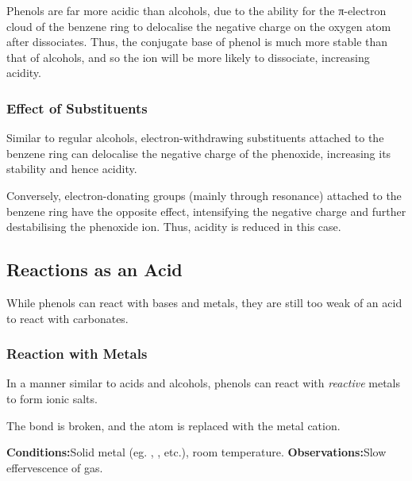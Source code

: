 			Phenols are far more acidic than alcohols, due to the ability for the π-electron cloud of the benzene ring to delocalise the
			negative charge on the oxygen atom after  dissociates. Thus, the conjugate base of phenol is much more stable than
			that of alcohols, and so the  ion will be more likely to dissociate, increasing acidity.

			\subsubsection{Effect of Substituents}

				Similar to regular alcohols, electron-withdrawing substituents attached to the benzene ring can delocalise the negative
				charge of the phenoxide, increasing its stability and hence acidity.

				Conversely, electron-donating groups (mainly through resonance) attached to the benzene ring have the opposite effect,
				intensifying the negative charge and further destabilising the phenoxide ion. Thus, acidity is reduced in this case.




		\subsection{Reactions as an Acid}

			While phenols can react with bases and metals, they are still too weak of an acid to react with carbonates.

			\subsubsection{Reaction with Metals}
				In a manner similar to acids and alcohols, phenols can react with \textit{reactive} metals to form ionic salts.

				The  bond is broken, and the  atom is replaced with the metal cation.

				\vspace{1.5em}
				\vbox{\textbf{Conditions:}\tabto{35mm}Solid metal (eg. , , etc.), room temperature.}
				\vbox{\textbf{Observations:}\tabto{35mm}Slow effervescence of  gas.}


